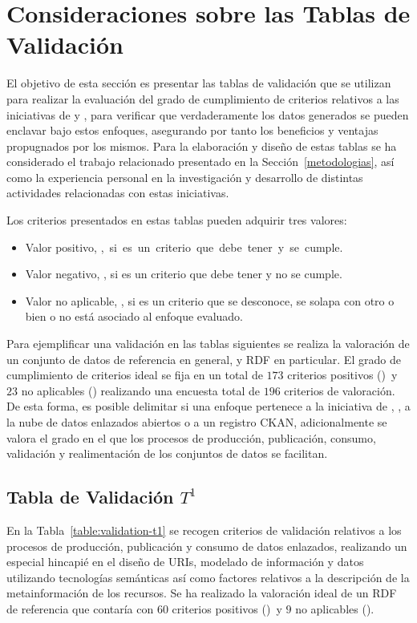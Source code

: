 \section{Consideraciones sobre las Tablas de Validación}
El objetivo de esta sección es presentar las tablas de validación que se utilizan para realizar 
la evaluación del grado de cumplimiento de criterios relativos a las iniciativas de 
\linkeddata y \opendata, para verificar que verdaderamente los datos generados se pueden enclavar 
bajo estos enfoques, asegurando por tanto los beneficios y ventajas propugnados por los mismos. Para la elaboración 
y diseño de estas tablas se ha considerado el trabajo relacionado presentado en la Sección~\ref{metodologias}, así 
como la experiencia personal en la investigación y desarrollo de distintas actividades relacionadas con estas iniciativas. 

Los criterios presentados en estas tablas pueden adquirir tres valores:
\begin{itemize}
 \item Valor positivo, \si, si es un criterio que debe tener y se cumple.
 \item Valor negativo, \no, si es un criterio que debe tener y no se cumple.
 \item Valor no aplicable, \na, si es un criterio que se desconoce, se solapa con otro o bien 
o no está asociado al enfoque evaluado.
\end{itemize}

Para ejemplificar una validación en las tablas siguientes se realiza la valoración de un conjunto 
de datos de referencia en general, y \datasets RDF en particular. El grado de cumplimiento de criterios 
ideal se fija en un total de $173$ criterios positivos (\si) y $23$ no aplicables (\na) realizando 
una encuesta total de $196$ criterios de valoración. De esta forma, es posible delimitar si una enfoque 
pertenece a la iniciativa de \opendata, \linkeddata, a la nube de datos enlazados abiertos o 
a un registro \gls{CKAN}, adicionalmente se valora el grado en el que los procesos de producción, publicación, 
consumo, validación y realimentación de los conjuntos de datos se facilitan. 

\subsection{Tabla de Validación $T^{1}$}
En la Tabla~\ref{table:validation-t1} se recogen criterios de validación relativos a los 
procesos de producción, publicación y consumo de datos enlazados, realizando un especial hincapié 
en el diseño de \gls{URI}s, modelado de información y datos utilizando tecnologías semánticas así como factores relativos a la 
descripción de la metainformación de los recursos. Se ha realizado la valoración ideal 
de un \dataset \gls{RDF} de referencia que contaría con $60$ criterios positivos (\si) y $9$ no aplicables 
(\na).

